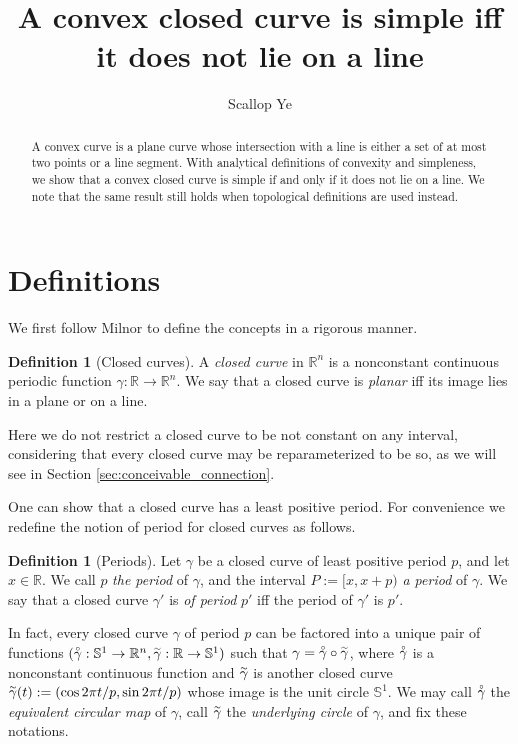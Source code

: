 \documentclass{amsart}
\title{A convex closed curve is simple iff it does not lie on a line}
\author{Scallop Ye}
\theoremstyle{definition}
\newtheorem{definition}[proposition]{Definition}
\theoremstyle{remark}
\newcommand{\lring}[1]{\accentset{\circ}{#1}}
\newcommand{\ltilde}[1]{\accentset{\sim}{#1}}
\begin{document}
\begin{abstract}
    A convex curve is a plane curve whose intersection with a
    line is either a set of at most two points or a line segment.
    With analytical definitions of convexity and simpleness,
    we show that a convex closed curve is simple
    if and only if it does not lie on a line.
    We note that the same result still holds when
    topological definitions are used instead.
\end{abstract}

\maketitle

\section{Definitions}

We first follow Milnor \cite{milnor} to
define the concepts in a rigorous manner.

\begin{definition}[Closed curves]
    A \emph{closed curve} in $\mathbb{R}^n$
    is a nonconstant continuous periodic function
    $\gamma:\mathbb{R}\to\mathbb{R}^n$. We say that a closed curve
    is \emph{planar} iff its image lies in a plane or on a line.
\end{definition}

Here we do not restrict a closed curve to be not constant on any interval,
considering that every closed curve may be
reparameterized to be so, as we will see in Section
\ref{sec:conceivable_connection}.

One can show that a closed curve has a least positive period.
For convenience we redefine the notion of period for closed curves
as follows.

\begin{definition}[Periods]
    Let $\gamma$ be a closed curve of least positive period $p$,
    and let $x\in\mathbb{R}$. We call $p$ \emph{the period} of $\gamma$,
    and the interval $P:=[x,x+p)$ \emph{a period} of $\gamma$.
    We say that a closed curve $\gamma'$ is \emph{of period} $p'$
    iff the period of $\gamma'$ is $p'$.
\end{definition}

In fact, every closed curve $\gamma$ of period $p$
can be factored into a unique pair of functions
$(\lring{\gamma}:\mathbb{S}^1\to\mathbb{R}^n,
    \ltilde{\gamma}:\mathbb{R}\to\mathbb{S}^1)$
such that $\gamma=\lring{\gamma}\circ\ltilde{\gamma}$,
where $\lring{\gamma}$ is a nonconstant continuous function
and $\ltilde{\gamma}$ is another closed curve
$\ltilde{\gamma}(t):=(\cos 2\pi t/p,\sin 2\pi t/p)$
whose image is the unit circle $\mathbb{S}^1$. We may call
$\lring{\gamma}$ the \emph{equivalent circular map} of $\gamma$,
call $\ltilde{\gamma}$ the \emph{underlying circle} of $\gamma$,
and fix these notations.
\end{document}
